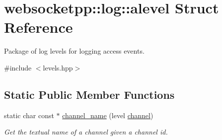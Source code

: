\hypertarget{structwebsocketpp_1_1log_1_1alevel}{}\section{websocketpp\+:\+:log\+:\+:alevel Struct Reference}
\label{structwebsocketpp_1_1log_1_1alevel}


Package of log levels for logging access events.  




{\ttfamily \#include $<$levels.\+hpp$>$}

\subsection*{Static Public Member Functions}
\begin{DoxyCompactItemize}
\item 
static char const  $\ast$ \mbox{\hyperlink{structwebsocketpp_1_1log_1_1alevel_a7145c18f40f74cff4946994c14634ce9}{channel\+\_\+name}} (level \mbox{\hyperlink{classchannel}{channel}})
\begin{DoxyCompactList}\small\item\em Get the textual name of a channel given a channel id. \end{DoxyCompactList}\end{DoxyCompactItemize}
